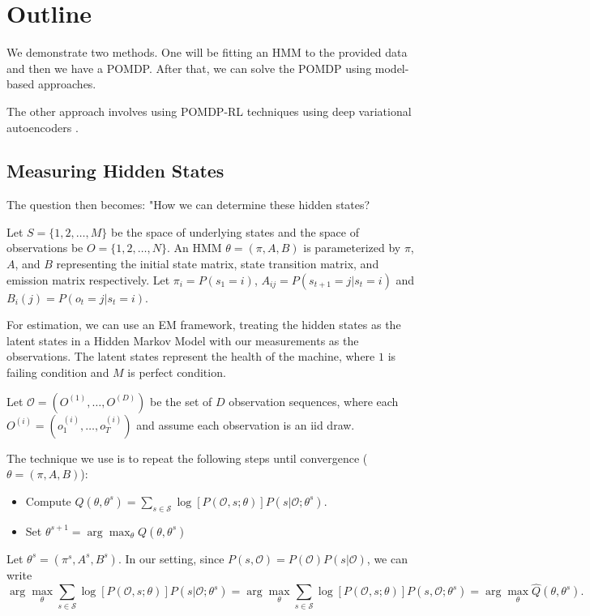 \documentclass[english]{article}
\numberwithin{equation}{section}
\begin{document}
	\section*{Outline}
	We demonstrate two methods. One will be fitting an HMM to the provided data and then we have a POMDP. After that, we can solve the POMDP using model-based approaches.
	
	The other approach involves using POMDP-RL techniques using deep variational autoencoders
	.
	\subsection*{Measuring Hidden States}
	The question then becomes: "How we can determine these hidden states?
	
	Let $S=\{1,2,\ldots,M\}$ be the space of underlying states and the space of observations be $O=\{1,2,\ldots,N\}$. An HMM $\theta=(\pi,A,B)$ is parameterized by $\pi$, $A$, and $B$ representing the initial state matrix, state transition matrix, and emission matrix respectively. Let $\pi_i=P(s_1=i)$, $A_{ij}=P(s_{t+1}=j|s_t=i)$ and $B_i(j)=P(o_t=j|s_t=i)$.
	
	For estimation, we can use an EM framework, treating the hidden states as the latent states in a Hidden Markov Model with our measurements as the observations. The latent states represent the health of the machine, where $1$ is failing condition and $M$ is perfect condition.
	
	Let $\mathcal{O} = (O^{(1)},\ldots,O^{(D)})$ be the set of $D$ observation sequences, where each $O^{(i)}=(o_1^{(i)},\ldots,o_{T}^{(i)})$ and assume each observation is an iid draw.

	The technique we use is to repeat the following steps until convergence ($\theta = (\pi,A,B)$):
	\begin{itemize}
		\item Compute $Q(\theta,\theta^s) = \sum_{s\in \mathcal{S}} \log [P(\mathcal{O},s;\theta)]P(s|\mathcal{O};\theta^s).$
		\item Set $\theta^{s+1} = \arg \max_{\theta} Q(\theta, \theta^s)$
	\end{itemize}
	
	Let $\theta^s = (\pi^s,A^s,B^s)$. In our setting, since $P(s,\mathcal{O})=P(\mathcal{O})P(s|\mathcal{O})$, we can write
	$$
	\arg \max_{\theta} \sum_{s\in \mathcal{S}} \log [P(\mathcal{O},s;\theta)] P(s|\mathcal{O};\theta^{s}) = \arg \max_{\theta} \sum_{s\in \mathcal{S}} \log [P(\mathcal{O},s;\theta)] P(s,\mathcal{O};\theta^{s})=\arg \max_{\theta} \hat{Q}(\theta,\theta^s).
	$$
	
\end{document}
